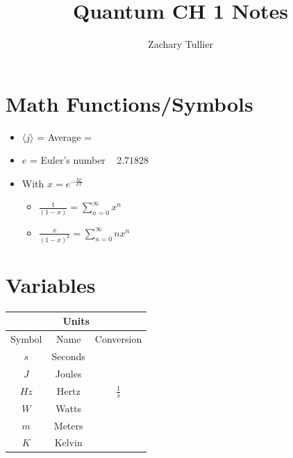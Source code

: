 \documentclass[10pt]{article}
\begin{document}
\title{Quantum CH 1 Notes}
\author[1]{Zachary Tullier}
\date{}
\maketitle




\section{Math Functions/Symbols}
    \begin{itemize}
        \item $\langle j \rangle$ = Average = 
        \item $e$ = Euler's number ~ $2.71828$
        \item With $x = e^{- \frac{h \nu}{k T}}$
        \begin{itemize}
            \item $\frac{1}{(1-x)} = \sum_{n=0}^\infty x^n$
            \item $\frac{x}{(1-x)^2} = \sum_{n=0}^\infty nx^n$
        \end{itemize}
    \end{itemize}

\section{Variables}
        \begin{table}
        \centering
            \begin{tabular}{|c|c|c|} \hline 
                \multicolumn{3}{|c|}{Units}\\ \hline 
                Symbol  &   Name    &   Conversion\\ \hline 
                $s$     &   Seconds &\\ \hline 
                $J$     &   Joules  &\\ \hline 
                $Hz$    &   Hertz   &   $\frac{1}{s}$\\ \hline 
                $W$     &   Watts   &\\ \hline 
                $m$     &   Meters  &\\ \hline 
                $K$     &   Kelvin  &\\ \hline
            \end{tabular}
        \label{tab:unit}
        \end{table} 
\end{document}
